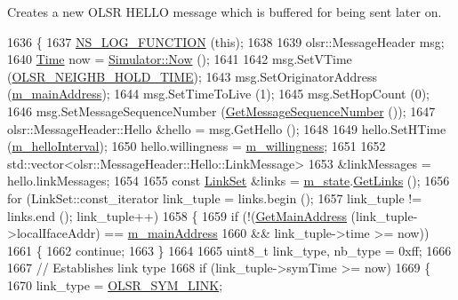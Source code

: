 Creates a new O\+L\+SR H\+E\+L\+LO message which is buffered for being sent later on. 


\begin{DoxyCode}
1636 \{
1637   \hyperlink{log-macros-disabled_8h_a90b90d5bad1f39cb1b64923ea94c0761}{NS\_LOG\_FUNCTION} (\textcolor{keyword}{this});
1638 
1639   olsr::MessageHeader msg;
1640   \hyperlink{namespacens3_1_1TracedValueCallback_a7ffd3e7c142ffe7c8a1d2db9b8de38ec}{Time} now = \hyperlink{classns3_1_1Simulator_ac3178fa975b419f7875e7105be122800}{Simulator::Now} ();
1641 
1642   msg.SetVTime (\hyperlink{olsr-routing-protocol_8cc_a32428f0b560f93c0a160b27181704faa}{OLSR\_NEIGHB\_HOLD\_TIME});
1643   msg.SetOriginatorAddress (\hyperlink{classns3_1_1olsr_1_1RoutingProtocol_a58cc50ed5d1039aab603e90e318aabfb}{m\_mainAddress});
1644   msg.SetTimeToLive (1);
1645   msg.SetHopCount (0);
1646   msg.SetMessageSequenceNumber (\hyperlink{classns3_1_1olsr_1_1RoutingProtocol_af8656b873ecc22d25d5e5795f936d61a}{GetMessageSequenceNumber} ());
1647   olsr::MessageHeader::Hello &hello = msg.GetHello ();
1648 
1649   hello.SetHTime (\hyperlink{classns3_1_1olsr_1_1RoutingProtocol_ac973c86cbf21168c11cd7f16acc1ae4c}{m\_helloInterval});
1650   hello.willingness = \hyperlink{classns3_1_1olsr_1_1RoutingProtocol_a2e94c2954ffa92d1c7d3b627087c9430}{m\_willingness};
1651 
1652   std::vector<olsr::MessageHeader::Hello::LinkMessage>
1653   &linkMessages = hello.linkMessages;
1654 
1655   \textcolor{keyword}{const} \hyperlink{namespacens3_1_1olsr_a60381cc41d65a2e0daabd286077a378a}{LinkSet} &links = \hyperlink{classns3_1_1olsr_1_1RoutingProtocol_a07942ec1a7df71b609c8d2ff3b567c49}{m\_state}.\hyperlink{classns3_1_1olsr_1_1OlsrState_a1d8f1a95165973f05e3fd1ff0d76fbda}{GetLinks} ();
1656   \textcolor{keywordflow}{for} (LinkSet::const\_iterator link\_tuple = links.begin ();
1657        link\_tuple != links.end (); link\_tuple++)
1658     \{
1659       \textcolor{keywordflow}{if} (!(\hyperlink{classns3_1_1olsr_1_1RoutingProtocol_ae01451170fb389d322b33ed6d954f460}{GetMainAddress} (link\_tuple->localIfaceAddr) == 
      \hyperlink{classns3_1_1olsr_1_1RoutingProtocol_a58cc50ed5d1039aab603e90e318aabfb}{m\_mainAddress}
1660             && link\_tuple->time >= now))
1661         \{
1662           \textcolor{keywordflow}{continue};
1663         \}
1664 
1665       uint8\_t link\_type, nb\_type = 0xff;
1666 
1667       \textcolor{comment}{// Establishes link type}
1668       \textcolor{keywordflow}{if} (link\_tuple->symTime >= now)
1669         \{
1670           link\_type = \hyperlink{olsr-routing-protocol_8cc_aa7acefeda0e22f22d9ca6b9f445859d7}{OLSR\_SYM\_LINK};

\end{DoxyCode}

